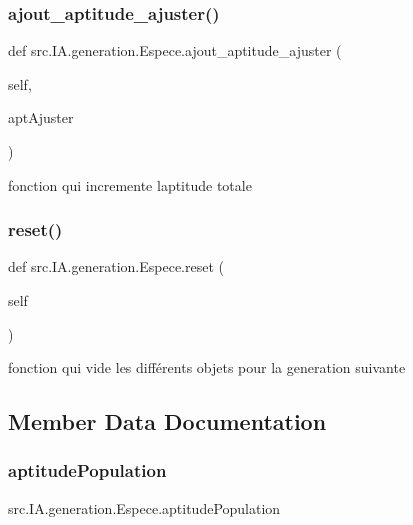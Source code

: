 \subsubsection{\texorpdfstring{ajout\+\_\+aptitude\+\_\+ajuster()}{ajout\_aptitude\_ajuster()}}
{\footnotesize\ttfamily def src.\+I\+A.\+generation.\+Espece.\+ajout\+\_\+aptitude\+\_\+ajuster (\begin{DoxyParamCaption}\item[{}]{self,  }\item[{}]{apt\+Ajuster }\end{DoxyParamCaption})}



fonction qui incremente l\textquotesingle{}aptitude totale 

\mbox{\label{classsrc_1_1_i_a_1_1generation_1_1_espece_adc4651cd3b27b03fdb3d3c45fcda58c4}} 
\subsubsection{\texorpdfstring{reset()}{reset()}}
{\footnotesize\ttfamily def src.\+I\+A.\+generation.\+Espece.\+reset (\begin{DoxyParamCaption}\item[{}]{self }\end{DoxyParamCaption})}



fonction qui vide les différents objets pour la generation suivante 



\subsection{Member Data Documentation}
\mbox{\label{classsrc_1_1_i_a_1_1generation_1_1_espece_a92404cd84bd75c92fbcc3e2407484182}} 
\subsubsection{\texorpdfstring{aptitude\+Population}{aptitudePopulation}}
{\footnotesize\ttfamily src.\+I\+A.\+generation.\+Espece.\+aptitude\+Population}

